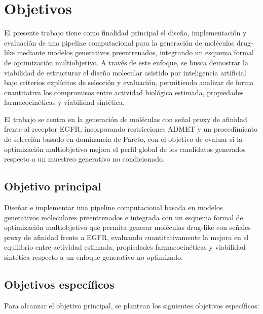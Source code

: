 \documentclass[IB]{TFUOC}%
\begin{document}
\section{Objetivos}

El presente trabajo tiene como finalidad principal el diseño, implementación y evaluación de una pipeline computacional para la generación de moléculas drug-like mediante modelos generativos preentrenados, integrando un esquema formal de optimización multiobjetivo. A través de este enfoque, se busca demostrar la viabilidad de estructurar el diseño molecular asistido por inteligencia artificial bajo criterios explícitos de selección y evaluación, permitiendo analizar de forma cuantitativa los compromisos entre actividad biológica estimada, propiedades farmacocinéticas y viabilidad sintética.

El trabajo se centra en la generación de moléculas con señal proxy de afinidad frente al receptor EGFR, incorporando restricciones ADMET y un procedimiento de selección basado en dominancia de Pareto, con el objetivo de evaluar si la optimización multiobjetivo mejora el perfil global de los candidatos generados respecto a un muestreo generativo no condicionado.

\subsection{Objetivo principal}

Diseñar e implementar una pipeline computacional basada en modelos generativos moleculares preentrenados e integrada con un esquema formal de optimización multiobjetivo que permita generar moléculas drug-like con señales proxy de afinidad frente a EGFR, evaluando cuantitativamente la mejora en el equilibrio entre actividad estimada, propiedades farmacocinéticas y viabilidad sintética respecto a un enfoque generativo no optimizado.

\subsection{Objetivos específicos}

Para alcanzar el objetivo principal, se plantean los siguientes objetivos específicos:
\end{document}
